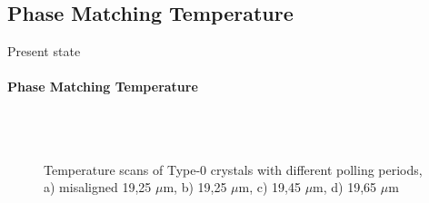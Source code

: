 \documentclass[serif,8pt]{beamer}
\begin{document}
{{\subsection{Phase Matching Temperature}
\begin{frame}{Present state}
	\framesubtitle{Phase Matching Temperature}
	\begin{figure}[!ht]
	  \centering
	  \caption{Temperature scans of Type-0 crystals with different polling periods, a) misaligned 19,25 $\mu$m, b) 19,25 $\mu$m, c) 19,45 $\mu$m, d) 19,65 $\mu$m}
	  \quad
	  \\
	  \quad
	  \\
	  \label{fig:gratings}
	\end{figure}
\end{frame}

}}
\end{document}
